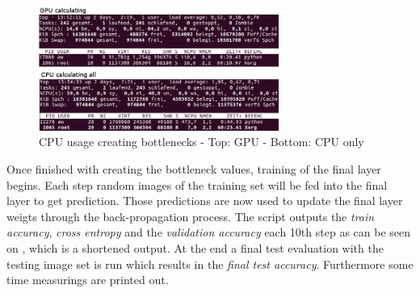 \begin{figure}[htbp]
\centering
\includegraphics[width=0.7\textwidth]{includes/bottlenecksCPUUsage}
\caption[CPU usage creating bottlenecks]{CPU usage creating bottlenecks - Top: GPU - Bottom: CPU only}
\label{fig:bottlenecksCPUUsage}
\end{figure}

Once finished with creating the bottleneck values, training of the final layer begins. Each step random images of the training set will be fed into the final layer to get prediction. Those predictions are now used to update the final layer weigts through the back-propagation process. The script outputs the \textit{train accuracy}, \textit{cross entropy} and the \textit{validation accuracy} each 10th step as can be seen on , which is a shortened output. At the end a final test evaluation with the testing image set is run which results in the \textit{final test accuracy}. Furthermore some time measurings are printed out. \citep{TensorFlowRetrain2017}

